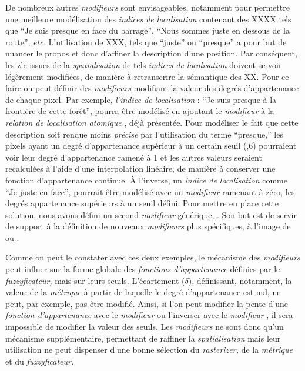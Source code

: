De nombreux autres \emph{modifieurs} sont envisageables, notamment
pour permettre une meilleure modélisation des \emph{indices de
  localisation} contenant des XXXX tels que \enquote{Je suis presque
  en face du barrage}, \enquote{Nous sommes juste en dessous de la
  route}, \emph{etc.} L'utilisation de XXX, tels que \enquote{juste}
ou \enquote{presque} a pour but de nuancer le propos et donc d'affiner
la description d'une position. Par conséquent, les \ac{zlc} issues de
la \emph{spatialisation} de tels \emph{indices de localisation}
doivent se voir légèrement modifiées, de manière à retranscrire la
sémantique des XX. Pour ce faire on peut définir des \emph{modifieurs}
modifiant la valeur des degrés d'appartenance de chaque pixel. Par
exemple, \emph{l'indice de localisation} : \enquote{Je suis presque à
  la frontière de cette forêt}, pourra être modélisé en ajoutant le
\emph{modifieur} \onto[Presque] à la \emph{relation de localisation
  atomique} , déjà présentée. Pour
modéliser le fait que cette description soit rendue moins
\emph{précise} par l'utilisation du terme \enquote{presque,} les
pixels ayant un degré d'appartenance supérieur à un certain seuil (,6) pourraient voir leur degré d'appartenance ramené à 1 et les
autres valeurs seraient recalculées à l'aide d'une interpolation
linéaire, de manière à conserver une fonction d'appartenance
continue. À l'inverse, un \emph{indice de localisation} comme
\enquote{Je juste en face}, pourrait être modélisé avec un
\emph{modifieur} ramenant à zéro, les degrés appartenance supérieurs à
un seuil défini. Pour mettre en place cette solution, nous avons
défini un second \emph{modifieur} générique, . Son
but est de servir de support à la définition de nouveaux
\emph{modifieurs} plus spécifiques, à l'image de  ou
.


Comme on peut le constater avec ces deux exemples, le mécanisme des
\emph{modifieurs} peut influer sur la forme globale des
\emph{fonctions d'appartenance} définies par le \emph{fuzzyficateur,}
mais sur leurs seuils. L'écartement (\(\delta\)), définissant,
notamment, la valeur de la \emph{métrique} à partir de laquelle le
degré d'appartenance est nul, ne peut, par exemple, pas être
modifié. Ainsi, si l'on peut modifier la pente d'une \emph{fonction
  d'appartenance} avec le \emph{modifieur}  ou
l'inverser avec le \emph{modifieur} , il sera impossible de
modifier la valeur des seuils. Les \emph{modifieurs} ne sont donc
qu'un mécanisme supplémentaire, permettant de raffiner la
\emph{spatialisation} mais leur utilisation ne peut dispenser d'une
bonne sélection du \emph{rasterizer,} de la \emph{métrique} et du
\emph{fuzzyficateur.}

